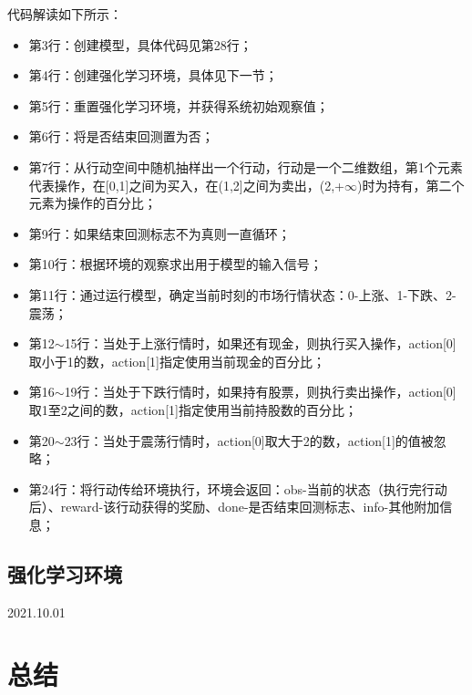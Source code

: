 代码解读如下所示：
\begin{itemize}
    \item 第3行：创建模型，具体代码见第28行；
    \item 第4行：创建强化学习环境，具体见下一节；
    \item 第5行：重置强化学习环境，并获得系统初始观察值；
    \item 第6行：将是否结束回测置为否；
    \item 第7行：从行动空间中随机抽样出一个行动，行动是一个二维数组，第1个元素代表操作，在[0,1]之间为买入，在(1,2]之间为卖出，(2,+$\infty$)时为持有，第二个
    元素为操作的百分比；
    \item 第9行：如果结束回测标志不为真则一直循环；
    \item 第10行：根据环境的观察求出用于模型的输入信号；
    \item 第11行：通过运行模型，确定当前时刻的市场行情状态：0-上涨、1-下跌、2-震荡；
    \item 第12$\sim$15行：当处于上涨行情时，如果还有现金，则执行买入操作，action[0]取小于1的数，action[1]指定使用当前现金的百分比；
    \item 第16$\sim$19行：当处于下跌行情时，如果持有股票，则执行卖出操作，action[0]取1至2之间的数，action[1]指定使用当前持股数的百分比；
    \item 第20$\sim$23行：当处于震荡行情时，action[0]取大于2的数，action[1]的值被忽略；
    \item 第24行：将行动传给环境执行，环境会返回：obs-当前的状态（执行完行动后）、reward-该行动获得的奖励、done-是否结束回测标志、info-其他附加信息；
\end{itemize}

\subsection{强化学习环境}
2021.10.01

\section{总结}
